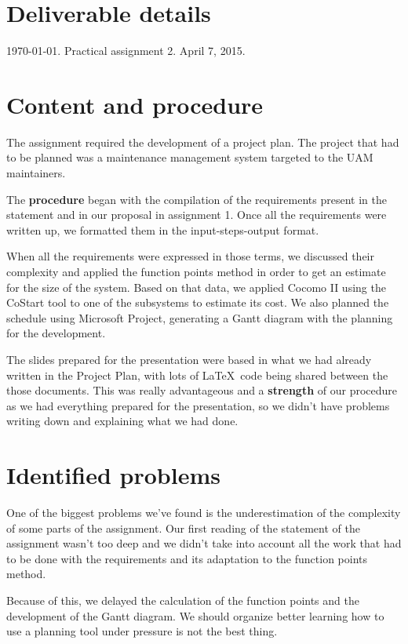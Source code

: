 \section{Deliverable details}

\noindent
{} \today.
 Practical assignment 2.
 April 7, 2015.

\section{Content and procedure}

The assignment required the development of a project plan. The project that had to be planned was a maintenance management system targeted to the UAM maintainers.

The \textbf{procedure} began with the compilation of the requirements present in the statement and in our proposal in assignment 1. Once all the requirements were written up, we formatted them in the input-steps-output format.

When all the requirements were expressed in those terms, we discussed their complexity and applied the function points method in order to get an estimate for the size of the system. Based on that data, we applied Cocomo II using the CoStart tool to one of the subsystems to estimate its cost. We also planned the schedule using Microsoft Project, generating a Gantt diagram with the planning for the development.

The slides prepared for the presentation were based in what we had already written in the Project Plan, with lots of \LaTeX\ code being shared between the those documents. This was really advantageous and a \textbf{strength} of our procedure as we had everything prepared for the presentation, so we didn't have problems writing down and explaining what we had done.

\section{Identified problems}

One of the biggest problems we've found is the underestimation of the complexity of some parts of the assignment. Our first reading of the statement of the assignment wasn't too deep and we didn't take into account all the work that had to be done with the requirements and its adaptation to the function points method.

Because of this, we delayed the calculation of the function points and the development of the Gantt diagram. We should organize better learning how to use a planning tool under pressure is not the best thing.

